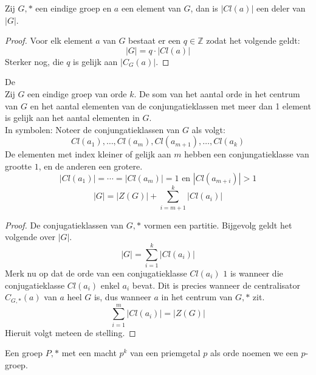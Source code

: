 \documentclass[main.tex]{subfiles}
\begin{document}
\begin{gev}
  \label{gev:orde-conjugatieklasse-deelt-orde-groep}
  Zij $G,*$ een eindige groep en $a$ een element van $G$, dan is $|Cl(a)|$ een deler van $|G|$.
  
  \begin{proof}
    Voor elk element $a$ van $G$ bestaat er een $q \in \mathbb{Z}$ zodat het volgende geldt:
    \[ |G| = q \cdot |Cl(a)| \]
    Sterker nog, die $q$ is gelijk aan $|C_{G}(a)|$.
  \end{proof}
\end{gev}

\begin{st}
  \label{st:klasvergelijking}
  De \\
  Zij $G$ een eindige groep van orde $k$.
  De som van het aantal orde in het centrum van $G$ en het aantal elementen van de conjungatieklassen met meer dan 1 element is gelijk aan het aantal elementen in $G$.\\
  In symbolen: Noteer de conjungatieklassen van $G$ als volgt:
  \[ Cl(a_{1}),\dotsc, Cl(a_{m}), Cl(a_{m+1}), \dotsc, Cl(a_{k}) \]
  De elementen met index kleiner of gelijk aan $m$ hebben een conjungatieklasse van grootte $1$, en de anderen een grotere.
  \[ |Cl(a_{1})| = \dotsb = |Cl(a_{m})| = 1 \text{ en } |Cl(a_{m+i})| > 1\]
  \[ |G| = |Z(G)| + \sum_{i=m+1}^{k}|Cl(a_{i})| \]

  \begin{proof}
    De conjugatieklassen van $G,*$ vormen een partitie.
    Bijgevolg geldt het volgende over $|G|$.
    \[ |G| = \sum_{i=1}^{k}|Cl(a_{i})| \]
    Merk nu op dat de orde van een conjugatieklasse $Cl(a_{i})$ $1$ is wanneer die conjugatieklasse $Cl(a_{i})$ enkel $a_{i}$ bevat.
    Dit is precies wanneer de centralisator $C_{G,*}(a)$ van $a$ heel $G$ is, dus wanneer $a$ in het centrum van $G,*$ zit.
    \[ \sum_{i=1}^{m}|Cl(a_{i})| = |Z(G)| \]
    Hieruit volgt meteen de stelling.
  \end{proof}
\end{st}

\begin{de}
  Een groep $P,*$ met een macht $p^{k}$ van een priemgetal $p$ als orde noemen we een $p$-groep.
\end{de}
\end{document}
